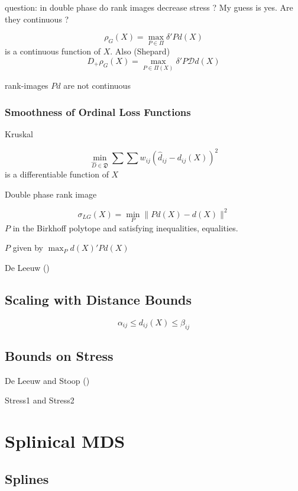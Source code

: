 \documentclass[
  12pt,
  letterpaper,
  DIV=11,
  numbers=noendperiod]{scrreprt}
\theoremstyle{remark}
\begin{document}
question: in double phase do rank images decrease stress ? My guess is
yes. Are they continuous ?

\[\rho_G(X)=\max_{P\in\Pi} \delta'Pd(X)\] is a continuous function of
\(X\). Also (Shepard) \[
D_+\rho_G(X)=\max_{P\in\Pi(X)}\delta'P\mathcal{D}d(X)
\]

rank-images \(Pd\) are not continuous

\subsection{Smoothness of Ordinal Loss
Functions}\label{smoothness-of-ordinal-loss-functions}

Kruskal

\[
\min_{\hat D\in\mathfrak{D}}\sum\sum w_{ij}(\hat d_{ij}-d_{ij}(X))^2
\] is a differentiable function of \(X\)

Double phase rank image

\[
\sigma_{LG}(X)=\min_P\|Pd(X)-d(X)\|^2
\] \(P\) in the Birkhoff polytope and satisfying inequalities,
equalities.

\(P\) given by \(\max_P d(X)'Pd(X)\)

De Leeuw ()

\section{Scaling with Distance
Bounds}\label{scaling-with-distance-bounds}

\[
\alpha_{ij}\leq d_{ij}(X)\leq\beta_{ij}
\]

\section{Bounds on Stress}\label{bounds-on-stress}

De Leeuw and Stoop ()

Stress1 and Stress2


\chapter{Splinical MDS}\label{chsplinical}

\section{Splines}\label{mathsplines}
\end{document}
